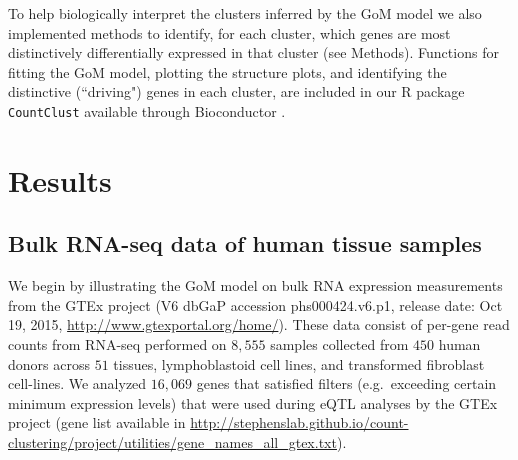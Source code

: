 \documentclass[10pt,letterpaper]{article}
\begin{document}

To help biologically interpret the clusters inferred by the GoM model we also implemented methods to identify, for each cluster, which genes
are most distinctively differentially expressed in that cluster (see Methods). Functions for fitting the GoM model, plotting the
structure plots, and identifying the distinctive (``driving") genes in each cluster, are included in our R package {\tt CountClust} \cite{Dey2016} available through Bioconductor \cite{Gentleman2003}.


\section*{Results}

\subsection*{Bulk RNA-seq data of human tissue samples}

We begin by illustrating the GoM model on bulk RNA expression measurements from the GTEx project (V6 dbGaP accession phs000424.v6.p1, release date: Oct 19, 2015, \url{http://www.gtexportal.org/home/}).  These data consist of per-gene read counts from RNA-seq performed on $8,555$ samples collected from $450$ human donors across $51$ tissues, lymphoblastoid cell lines, and transformed fibroblast cell-lines. We analyzed $16,069$ genes that satisfied filters (e.g.~exceeding certain minimum expression levels) that were used during eQTL analyses by the GTEx project (gene list available in \url{http://stephenslab.github.io/count-clustering/project/utilities/gene_names_all_gtex.txt}).
\end{document}
